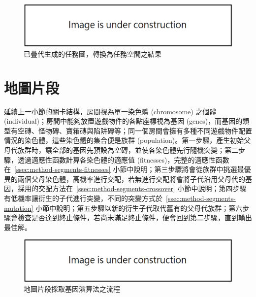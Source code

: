 \begin{figure}[h]
  \begin{center}
    \includegraphics[width=1.0\textwidth]{figures/under_construction.png}
    \caption{已疊代生成的任務圖，轉換為任務空間之結果} 
    \label{fig:mission-to-space}
  \end{center}
\end{figure}

\section{地圖片段}
\label{sec:method-segments}

延續上一小節的關卡結構，房間視為單一染色體 (chromosome) 之個體 (individual)；房間中能夠放置遊戲物件的各點座標視為基因 (genes)，而基因的類型有空磚、怪物磚、寶箱磚與陷阱磚等；同一個房間會擁有多種不同遊戲物件配置情況的染色體，這些染色體的集合便是族群 (population)。第一步驟，產生初始父母代族群時，讓全部的基因先預設為空磚，並使各染色體先行隨機突變；第二步驟，透過適應性函數計算各染色體的適應值 (fitnesses)，完整的適應性函數在~\ref{ssec:method-segments-fitnesses} 小節中說明；第三步驟將會從族群中挑選最優異的兩個父母染色體，高機率進行交配，若無進行交配將會將子代沿用父母代的基因，採用的交配方法在~\ref{ssec:method-segments-crossover} 小節中說明；第四步驟有低機率讓衍生的子代進行突變，不同的突變方式於~\ref{ssec:method-segments-mutation} 小節中說明；第五步驟以新的衍生子代取代舊有的父母代族群；第六步驟會檢查是否達到終止條件，若尚未滿足終止條件，便會回到第二步驟，直到輸出最佳解。

\begin{figure}[h]
  \begin{center}
    \includegraphics[width=1.0\textwidth]{figures/under_construction.png}
    \caption{地圖片段採取基因演算法之流程} 
    \label{fig:segments-with-ga}
  \end{center}
\end{figure}

